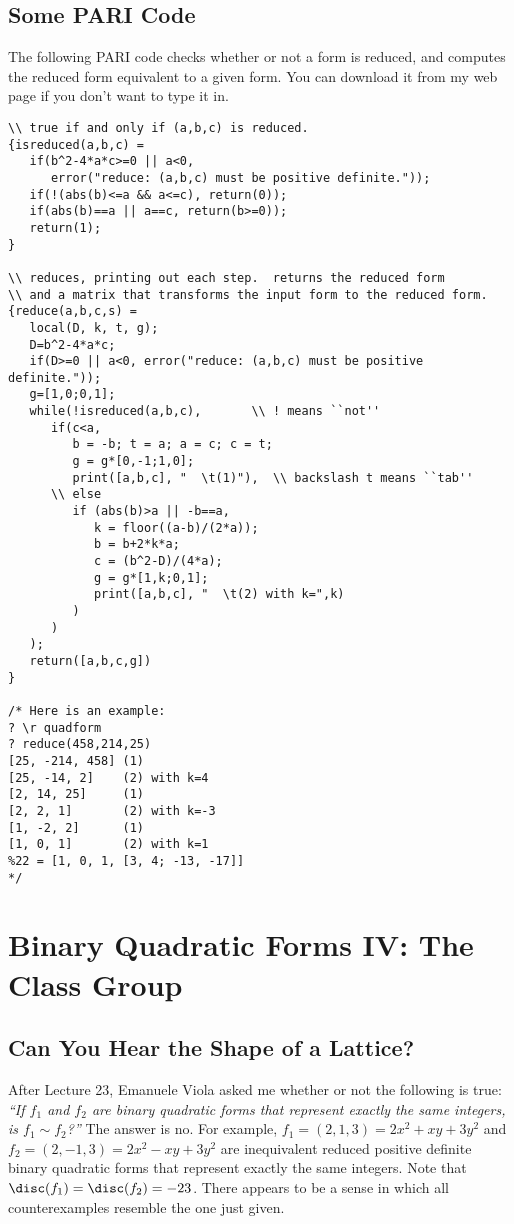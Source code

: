 \documentclass[11pt]{report}
\begin{document}
\section{Some PARI Code}
The following PARI code checks whether or not a form is reduced,
and computes the reduced form equivalent to a given form.
You can download it from my web page if you don't want to type
it in.
\begin{verbatim}
\\ true if and only if (a,b,c) is reduced.
{isreduced(a,b,c) = 
   if(b^2-4*a*c>=0 || a<0, 
      error("reduce: (a,b,c) must be positive definite."));
   if(!(abs(b)<=a && a<=c), return(0));
   if(abs(b)==a || a==c, return(b>=0));
   return(1);
}

\\ reduces, printing out each step.  returns the reduced form
\\ and a matrix that transforms the input form to the reduced form.
{reduce(a,b,c,s) = 
   local(D, k, t, g); 
   D=b^2-4*a*c;
   if(D>=0 || a<0, error("reduce: (a,b,c) must be positive definite."));
   g=[1,0;0,1];
   while(!isreduced(a,b,c),       \\ ! means ``not''
      if(c<a, 
         b = -b; t = a; a = c; c = t; 
         g = g*[0,-1;1,0];
         print([a,b,c], "  \t(1)"),  \\ backslash t means ``tab''
      \\ else
         if (abs(b)>a || -b==a, 
            k = floor((a-b)/(2*a)); 
            b = b+2*k*a;
            c = (b^2-D)/(4*a);
            g = g*[1,k;0,1];
            print([a,b,c], "  \t(2) with k=",k)
         )
      )
   );
   return([a,b,c,g])
}

/* Here is an example:
? \r quadform
? reduce(458,214,25)
[25, -214, 458] (1)
[25, -14, 2]    (2) with k=4
[2, 14, 25]     (1)
[2, 2, 1]       (2) with k=-3
[1, -2, 2]      (1)
[1, 0, 1]       (2) with k=1
%22 = [1, 0, 1, [3, 4; -13, -17]]
*/
\end{verbatim}










\chapter{Binary Quadratic Forms IV: The Class Group}



\section{Can You Hear the Shape of a Lattice?}
After Lecture 23, Emanuele Viola asked me whether or
not the following is true: {\em ``If $f_1$ and $f_2$ are binary quadratic
forms that represent exactly the same integers, is $f_1\sim f_2$?''}
The answer is no.  For example,
$f_1=(2,1,3)=2x^2 + xy+3y^2$ and
$f_2=(2,-1,3)=2x^2 -xy+3y^2$
are inequivalent reduced positive definite binary quadratic
forms that represent exactly the same integers.   Note that
$\disc(f_1) = \disc(f_2)=-23$.
There appears to be a sense in which
all counterexamples resemble the one just given.
\end{document}
